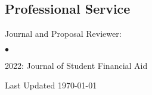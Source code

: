 \documentclass[margin,line]{res}
\newenvironment{list2}{
  \begin{list}{$\bullet$}{%
      \setlength{\itemsep}{0in}
      \setlength{\parsep}{0in} \setlength{\parskip}{0in}
      \setlength{\topsep}{0in} \setlength{\partopsep}{0in} 
      \setlength{\leftmargin}{0.2in}}}{\end{list}}
\begin{document}
\begin{resume}
\section{\sc Professional Service} 
Journal and Proposal Reviewer:
\begin{list2}
\item 2022: Journal of Student Financial Aid
\end{list2}

\end{resume}

\begin{center}
  \vfill
  Last Updated \today
\end{center}
\end{document}
